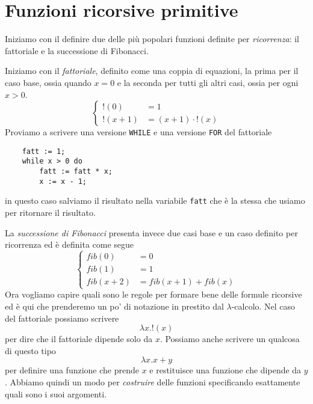 \chapter{Funzioni ricorsive primitive}
Iniziamo con il definire due delle più popolari funzioni
definite per \emph{ricorrenza}: il fattoriale e la successione
di Fibonacci.

Iniziamo con il \emph{fattoriale}, definito come una coppia
di equazioni, la prima per il caso base, ossia quando $x = 0$
e la seconda per tutti gli altri casi, ossia per ogni $x > 0$.
\[
	\begin{cases}
		!(0)     & = 1                  \\
		!(x + 1) & = (x + 1) \cdot !(x)
	\end{cases}
\]
Proviamo a scrivere una versione \verb|WHILE| e una versione
\verb|FOR| del fattoriale
\begin{verbatim}
    fatt := 1;
    while x > 0 do
        fatt := fatt * x;
        x := x - 1;
\end{verbatim}
in questo caso salviamo il risultato nella variabile
\verb|fatt| che è la stessa che usiamo per ritornare il
risultato.

La \emph{successione di Fibonacci} presenta invece due casi
base e un caso definito per ricorrenza ed è definita come
segue
\[
	\begin{cases}
		fib(0)     & = 0                   \\
		fib(1)     & = 1                   \\
		fib(x + 2) & = fib(x + 1) + fib(x)
	\end{cases}
\]
Ora vogliamo capire quali sono le regole per formare bene
delle formule ricorsive ed è qui che prenderemo un po' di
notazione in prestito dal $\lambda$-calcolo. Nel caso del
fattoriale possiamo scrivere
\[ \lambda x . !(x) \]
per dire che il fattoriale dipende solo da $x$. Possiamo anche
scrivere un qualcosa di questo tipo
\[ \lambda x . x + y \]
per definire una funzione che prende $x$ e restituisce una
funzione che dipende da $y$. Abbiamo quindi un modo per
\emph{costruire} delle funzioni specificando esattamente quali
sono i suoi argomenti.

